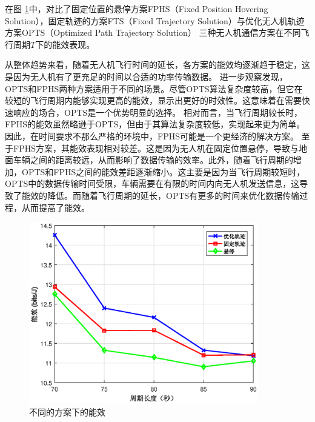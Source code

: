 

在图 \ref{不同的方案下的能效}中，对比了固定位置的悬停方案FPHS（Fixed Position Hovering Solution），固定轨迹的方案FTS（Fixed Trajectory Solution）与优化无人机轨迹方案OPTS（Optimized Path Trajectory Solution）
三种无人机通信方案在不同飞行周期$T$下的能效表现。

从整体趋势来看，随着无人机飞行时间的延长，各方案的能效均逐渐趋于稳定，这是因为无人机有了更充足的时间以合适的功率传输数据。
进一步观察发现，OPTS和FPHS两种方案适用于不同的场景。尽管OPTS算法复杂度较高，但它在较短的飞行周期内能够实现更高的能效，显示出更好的时效性。这意味着在需要快速响应的场合，OPTS是一个优势明显的选择。
相对而言，当飞行周期较长时，FPHS的能效虽然略逊于OPTS，但由于其算法复杂度较低，实现起来更为简单。因此，在时间要求不那么严格的环境中，FPHS可能是一个更经济的解决方案。
至于FPHS方案，其能效表现相对较差。这是因为无人机在固定位置悬停，导致与地面车辆之间的距离较远，从而影响了数据传输的效率。此外，随着飞行周期的增加，OPTS和FPHS之间的能效差距逐渐缩小。这主要是因为当飞行周期较短时，OPTS中的数据传输时间受限，车辆需要在有限的时间内向无人机发送信息，这导致了能效的降低。而随着飞行周期的延长，OPTS有更多的时间来优化数据传输过程，从而提高了能效。

\begin{figure}[H]
\centering
\includegraphics[width=10cm]{figures//chap4//不同的方案下的能效.eps}
\caption{不同的方案下的能效}
\label{不同的方案下的能效}
\end{figure}

